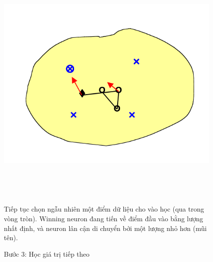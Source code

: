 \begin{figure}[h!]
  \begin{minipage}{0.4\textwidth}
	\centering
    \includegraphics[width=1\textwidth,keepaspectratio=true]{SOM4.png}
    \caption{Bước 3: Học giá trị tiếp theo}
  \end{minipage}
  ~
  \begin{minipage}{0.1\textwidth}
  \end{minipage}
  ~
  \begin{minipage}{0.5\textwidth}
  Tiếp tục chọn ngẫu nhiên một điểm dữ liệu cho vào học (qua trong vòng tròn).
  Winning neuron đang tiến về điểm đầu vào bằng lượng nhất định, và neuron lân cận di chuyển bởi một lượng nhỏ hơn (mũi tên).
  \end{minipage}
\end{figure}
 \vfill
